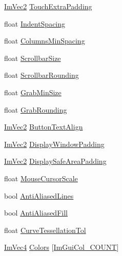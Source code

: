 \begin{DoxyCompactItemize}
\item 
\mbox{\hyperlink{struct_im_vec2}{Im\+Vec2}} \mbox{\hyperlink{struct_im_gui_style_ab518a0a67df8f14765acc491d7b460f4}{Touch\+Extra\+Padding}}
\item 
float \mbox{\hyperlink{struct_im_gui_style_a32ea292dee2b4e178a227acacd061921}{Indent\+Spacing}}
\item 
float \mbox{\hyperlink{struct_im_gui_style_a8fed04481e1d75bb95c97819f545e2ba}{Columns\+Min\+Spacing}}
\item 
float \mbox{\hyperlink{struct_im_gui_style_a96623380e624d2f2ec207449e700a226}{Scrollbar\+Size}}
\item 
float \mbox{\hyperlink{struct_im_gui_style_a00efbadb1ad7daa0ee7384864b147d71}{Scrollbar\+Rounding}}
\item 
float \mbox{\hyperlink{struct_im_gui_style_a04db033d001b343815cdcd2491576ef7}{Grab\+Min\+Size}}
\item 
float \mbox{\hyperlink{struct_im_gui_style_a42369d83032545066803a7db62936e8f}{Grab\+Rounding}}
\item 
\mbox{\hyperlink{struct_im_vec2}{Im\+Vec2}} \mbox{\hyperlink{struct_im_gui_style_a17246b12f4e069229d21808a87f78514}{Button\+Text\+Align}}
\item 
\mbox{\hyperlink{struct_im_vec2}{Im\+Vec2}} \mbox{\hyperlink{struct_im_gui_style_ab06d6f0c6c5f36ab0c14688448de66f6}{Display\+Window\+Padding}}
\item 
\mbox{\hyperlink{struct_im_vec2}{Im\+Vec2}} \mbox{\hyperlink{struct_im_gui_style_a8dd02a6a031ec8667e76aab1e28755bd}{Display\+Safe\+Area\+Padding}}
\item 
float \mbox{\hyperlink{struct_im_gui_style_a6448eb2273c8868d7ecccf1152857f68}{Mouse\+Cursor\+Scale}}
\item 
bool \mbox{\hyperlink{struct_im_gui_style_a0164b54454297971d40f3578b2c1ffeb}{Anti\+Aliased\+Lines}}
\item 
bool \mbox{\hyperlink{struct_im_gui_style_a1fcc22c258a2a73bd61efd18e7ce7e5a}{Anti\+Aliased\+Fill}}
\item 
float \mbox{\hyperlink{struct_im_gui_style_a41eb9377b63b8b85ab807c28e00198e9}{Curve\+Tessellation\+Tol}}
\item 
\mbox{\hyperlink{struct_im_vec4}{Im\+Vec4}} \mbox{\hyperlink{struct_im_gui_style_a2b4941240a38d1300c39a7fa4f03d0a3}{Colors}} \mbox{[}\mbox{\hyperlink{imgui_8h_a8e46ef7d0c76fbb1916171edfa4ae9e7ac911e17bec14cc3339cf3901a197628b}{Im\+Gui\+Col\+\_\+\+C\+O\+U\+NT}}\mbox{]}
\end{DoxyCompactItemize}


